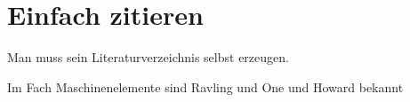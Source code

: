 \section{Einfach zitieren}

Man muss sein Literaturverzeichnis selbst erzeugen.

Im Fach Maschinenelemente sind Ravling\cite{Rav} und One\cite{on} und Howard\cite{How} bekannt
